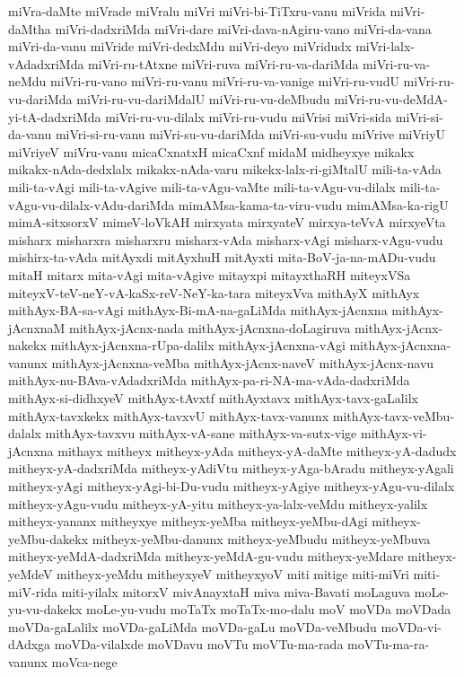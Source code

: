 {miVra-daMte
miVrade
miVralu
miVri
miVri-bi-TiTxru-vanu
miVrida
miVri-daMtha
miVri-dadxriMda
miVri-dare
miVri-dava-nAgiru-vano
miVri-da-vana
miVri-da-vanu
miVride
miVri-dedxMdu
miVri-deyo
miVridudx
miVri-lalx-vAdadxriMda
miVri-ru-tAtxne
miVri-ruva
miVri-ru-va-dariMda
miVri-ru-va-neMdu
miVri-ru-vano
miVri-ru-vanu
miVri-ru-va-vanige
miVri-ru-vudU
miVri-ru-vu-dariMda
miVri-ru-vu-dariMdalU
miVri-ru-vu-deMbudu
miVri-ru-vu-deMdA-yi-tA-dadxriMda
miVri-ru-vu-dilalx
miVri-ru-vudu
miVrisi
miVri-sida
miVri-si-da-vanu
miVri-si-ru-vanu
miVri-su-vu-dariMda
miVri-su-vudu
miVrive
miVriyU
miVriyeV
miVru-vanu
micaCxnatxH
micaCxnf
midaM
midheyxye
mikakx
mikakx-nAda-dedxlalx
mikakx-nAda-varu
mikekx-lalx-ri-giMtalU
mili-ta-vAda
mili-ta-vAgi
mili-ta-vAgive
mili-ta-vAgu-vaMte
mili-ta-vAgu-vu-dilalx
mili-ta-vAgu-vu-dilalx-vAdu-dariMda
mimAMsa-kama-ta-viru-vudu
mimAMsa-ka-rigU
mimA-sitxsorxV
mimeV-loVkAH
mirxyata
mirxyateV
mirxya-teVvA
mirxyeVta
misharx
misharxra
misharxru
misharx-vAda
misharx-vAgi
misharx-vAgu-vudu
mishirx-ta-vAda
mitAyxdi
mitAyxhuH
mitAyxti
mita-BoV-ja-na-mADu-vudu
mitaH
mitarx
mita-vAgi
mita-vAgive
mitayxpi
mitayxthaRH
miteyxVSa
miteyxV-teV-neY-vA-kaSx-reV-NeY-ka-tara
miteyxVva
mithAyX
mithAyx
mithAyx-BA-sa-vAgi
mithAyx-Bi-mA-na-gaLiMda
mithAyx-jAcnxna
mithAyx-jAcnxnaM
mithAyx-jAcnx-nada
mithAyx-jAcnxna-doLagiruva
mithAyx-jAcnx-nakekx
mithAyx-jAcnxna-rUpa-dalilx
mithAyx-jAcnxna-vAgi
mithAyx-jAcnxna-vanunx
mithAyx-jAcnxna-veMba
mithAyx-jAcnx-naveV
mithAyx-jAcnx-navu
mithAyx-nu-BAva-vAdadxriMda
mithAyx-pa-ri-NA-ma-vAda-dadxriMda
mithAyx-si-didhxyeV
mithAyx-tAvxtf
mithAyxtavx
mithAyx-tavx-gaLalilx
mithAyx-tavxkekx
mithAyx-tavxvU
mithAyx-tavx-vanunx
mithAyx-tavx-veMbu-dalalx
mithAyx-tavxvu
mithAyx-vA-sane
mithAyx-va-sutx-vige
mithAyx-vi-jAcnxna
mithayx
mitheyx
mitheyx-yAda
mitheyx-yA-daMte
mitheyx-yA-dadudx
mitheyx-yA-dadxriMda
mitheyx-yAdiVtu
mitheyx-yAga-bAradu
mitheyx-yAgali
mitheyx-yAgi
mitheyx-yAgi-bi-Du-vudu
mitheyx-yAgiye
mitheyx-yAgu-vu-dilalx
mitheyx-yAgu-vudu
mitheyx-yA-yitu
mitheyx-ya-lalx-veMdu
mitheyx-yalilx
mitheyx-yananx
mitheyxye
mitheyx-yeMba
mitheyx-yeMbu-dAgi
mitheyx-yeMbu-dakekx
mitheyx-yeMbu-danunx
mitheyx-yeMbudu
mitheyx-yeMbuva
mitheyx-yeMdA-dadxriMda
mitheyx-yeMdA-gu-vudu
mitheyx-yeMdare
mitheyx-yeMdeV
mitheyx-yeMdu
mitheyxyeV
mitheyxyoV
miti
mitige
miti-miVri
miti-miV-rida
miti-yilalx
mitorxV
mivAnayxtaH
miva
miva-Bavati
moLaguva
moLe-yu-vu-dakekx
moLe-yu-vudu
moTaTx
moTaTx-mo-dalu
moV
moVDa
moVDada
moVDa-gaLalilx
moVDa-gaLiMda
moVDa-gaLu
moVDa-veMbudu
moVDa-vi-dAdxga
moVDa-vilalxde
moVDavu
moVTu
moVTu-ma-rada
moVTu-ma-ra-vanunx
moVca-nege
}
